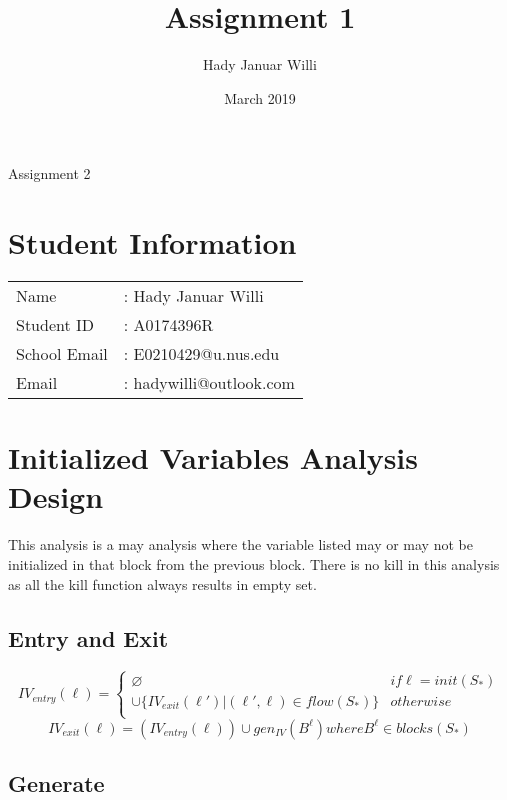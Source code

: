 \documentclass[11pt,a4paper,fleqn]{article}
\title{Assignment 1}
\author{Hady Januar Willi}
\date{March 2019}
\begin{document}
   \begin{center}
      \LARGE Assignment 2
   \end{center}
   \section{Student Information}

   \begin{tabular}{l l} 
      Name           & : Hady Januar Willi      \\ 
      Student ID     & : A0174396R              \\
      School Email   & : E0210429@u.nus.edu     \\
      Email          & : hadywilli@outlook.com  \\
   \end{tabular}
   
   \section{Initialized Variables Analysis Design}

   This analysis is a may analysis where the variable listed may or may not be initialized in that block from the previous block. 
   There is no kill in this analysis as all the kill function always results in empty set.

   \subsection{Entry and Exit}

   \begin{equation}
      IV_{entry}(\ell)=
      \begin{cases} 
         \varnothing & if \ell = init(S_*) \\ 
         \cup \{ IV_{exit}(\ell')|(\ell',\ell) \in flow(S_*) \} & otherwise \\   
      \end{cases}
   \end{equation}
   \begin{equation}
      IV_{exit}(\ell)=(IV_{entry}(\ell)) \cup gen_{IV}(B^{\ell}) where B^{\ell} \in blocks(S_*)
   \end{equation}
   
   \subsection{Generate}
\end{document}
